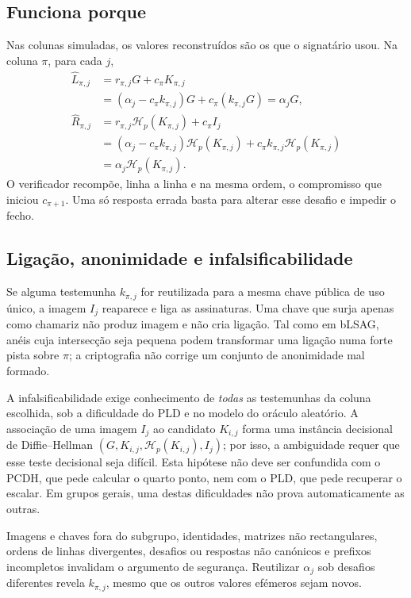 \subsection*{Funciona porque}

Nas colunas simuladas, os valores reconstruídos são os que o signatário
usou. Na coluna \(\pi\), para cada \(j\),
\begin{align*}
\widehat L_{\pi,j}
 &=r_{\pi,j}G+c_\pi K_{\pi,j}\\
 &=(\alpha_j-c_\pi k_{\pi,j})G
   +c_\pi(k_{\pi,j}G)
  =\alpha_jG,\\
\widehat R_{\pi,j}
 &=r_{\pi,j}\mathcal H_p(K_{\pi,j})+c_\pi I_j\\
 &=(\alpha_j-c_\pi k_{\pi,j})\mathcal H_p(K_{\pi,j})
   +c_\pi k_{\pi,j}\mathcal H_p(K_{\pi,j})\\
 &=\alpha_j\mathcal H_p(K_{\pi,j}).
\end{align*}
O verificador recompõe, linha a linha e na mesma ordem, o compromisso que
iniciou \(c_{\pi+1}\). Uma só resposta errada basta para alterar esse desafio
e impedir o fecho.

\subsection*{Ligação, anonimidade e infalsificabilidade}

Se alguma testemunha \(k_{\pi,j}\) for reutilizada para a mesma chave pública
de uso único, a imagem \(I_j\) reaparece e liga as assinaturas. Uma chave que
surja apenas como chamariz não produz imagem e não cria ligação. Tal como em
bLSAG, anéis cuja intersecção seja pequena podem transformar uma ligação numa
forte pista sobre \(\pi\); a criptografia não corrige um conjunto de
anonimidade mal formado.

A infalsificabilidade exige conhecimento de \emph{todas} as testemunhas da
coluna escolhida, sob a dificuldade do PLD e no modelo do oráculo aleatório.
A associação de uma imagem \(I_j\) ao candidato \(K_{i,j}\) forma uma
instância decisional de Diffie--Hellman
\((G,K_{i,j},\mathcal H_p(K_{i,j}),I_j)\); por isso, a ambiguidade requer que
esse teste decisional seja difícil. Esta hipótese não deve ser confundida com
o PCDH, que pede calcular o quarto ponto, nem com o PLD, que pede recuperar o
escalar. Em grupos gerais, uma destas dificuldades não prova automaticamente
as outras.

Imagens e chaves fora do subgrupo, identidades, matrizes não rectangulares,
ordens de linhas divergentes, desafios ou respostas não canónicos e prefixos
incompletos invalidam o argumento de segurança. Reutilizar
\(\alpha_j\) sob desafios diferentes revela \(k_{\pi,j}\), mesmo que os
outros valores efémeros sejam novos.

